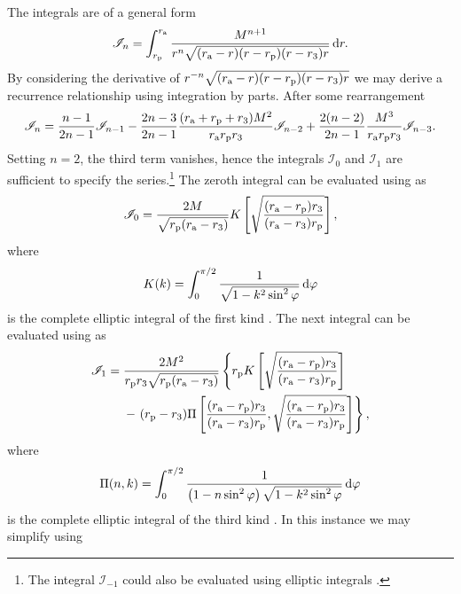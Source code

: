 The integrals are of a general form
\begin{equation}
\mathscr{I}_n = \int_{r_\mathrm{p}}^{r_\mathrm{a}}{\dfrac{M^{n+1}}{r^n\sqrt{(r_\mathrm{a} - r)(r - r_\mathrm{p})(r - r_3)r}}}\,\mathrm{d}{r}.
\end{equation}
By considering the derivative of $r^{-n}\sqrt{(r_\mathrm{a} - r)(r - r_\mathrm{p})(r - r_3)r}$ we may derive a recurrence relationship using integration by parts. After some rearrangement
\begin{equation}
\mathscr{I}_n = \dfrac{n - 1}{2n - 1}\mathscr{I}_{n-1} - \dfrac{2n - 3}{2n - 1} \dfrac{(r_\mathrm{a} + r_\mathrm{p} + r_3)M^2}{r_\mathrm{a}r_\mathrm{p}r_3}\mathscr{I}_{n-2} + \dfrac{2(n - 2)}{2n-1}\dfrac{M^3}{r_\mathrm{a}r_\mathrm{p}r_3}\mathscr{I}_{n-3}.
\end{equation}
Setting $n = 2$, the third term vanishes, hence the integrals $\mathscr{I}_0$ and $\mathscr{I}_1$ are sufficient to specify the series.\footnote{The integral $\mathscr{I}_{-1}$ could also be evaluated using elliptic integrals \citep[3.148.6]{Gradshteyn2000}.} The zeroth integral can be evaluated using \citet[3.147.6]{Gradshteyn2000} as
\begin{equation}
\mathscr{I}_0 = \dfrac{2M}{\sqrt{r_\mathrm{p}(r_\mathrm{a} - r_3)}}K\left[\sqrt{\dfrac{(r_\mathrm{a} - r_\mathrm{p})r_3}{(r_\mathrm{a} - r_3)r_\mathrm{p}}}\right],
\end{equation}
where
\begin{equation}
K(k) = \int_{0}^{\pi/2}{\frac{1}{\sqrt{1 - k^2 \sin^2\varphi}}}\,\mathrm{d}{\varphi}
\end{equation}
is the complete elliptic integral of the first kind \citep[19.2.4, 19.2.8]{Olver2010}. The next integral can be evaluated using \citet[3.149.6]{Gradshteyn2000} as
\begin{align}
\mathscr{I}_1 = {} & \dfrac{2M^2}{r_\mathrm{p}r_3\sqrt{r_\mathrm{p}(r_\mathrm{a} - r_3)}}\left\{r_\mathrm{p}K\left[\sqrt{\dfrac{(r_\mathrm{a} - r_\mathrm{p})r_3}{(r_\mathrm{a} - r_3)r_\mathrm{p}}}\right]\right. \nonumber \\*
 {} & - \left.(r_\mathrm{p} - r_3)\Pi\left[\dfrac{(r_\mathrm{a} - r_\mathrm{p})r_3}{(r_\mathrm{a} - r_3)r_\mathrm{p}}, \sqrt{\dfrac{(r_\mathrm{a} - r_\mathrm{p})r_3}{(r_\mathrm{a} - r_3)r_\mathrm{p}}}\right]\right\},
\end{align}
where
\begin{equation}
\Pi(n,k) = \int_{0}^{\pi/2}{\frac{1}{\left(1 - n \sin^2\varphi\right)\sqrt{1 - k^2 \sin^2\varphi}}}\,\mathrm{d}{\varphi}
\end{equation}
is the complete elliptic integral of the third kind \citep[19.2.7, 19.2.8]{Olver2010}. In this instance we may simplify using \citet[19.6.2]{Olver2010}
